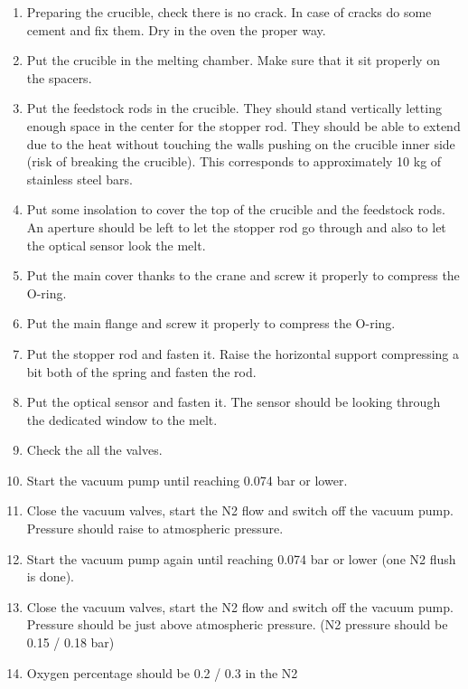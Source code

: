 \documentclass[../../main.tex]{subfiles}
\begin{document}
\begin{enumerate}
    \item Preparing the crucible, check there is no crack. In case of cracks do some cement and fix them. Dry in the oven the proper way.
    \item Put the crucible in the melting chamber. Make sure that it sit properly on the spacers.
    \item Put the feedstock rods in the crucible. They should stand vertically letting enough space in the center for the stopper rod. They should be able to extend due to the heat without touching the walls pushing on the crucible inner side (risk of breaking the crucible). This corresponds to approximately 10 kg of stainless steel bars.
    \item Put some insolation to cover the top of the crucible and the feedstock rods. An aperture should be left to let the stopper rod go through and also to let the optical sensor look the melt.
    \item Put the main cover thanks to the crane and screw it properly to compress the O-ring.
    \item Put the main flange and screw it properly to compress the O-ring.
    \item Put the stopper rod and fasten it. Raise the horizontal support compressing a bit both of the spring and fasten the rod.
    \item Put the optical sensor and fasten it. The sensor should be looking through the dedicated window to the melt.

    \item Check the all the valves.
    \item Start the vacuum pump until reaching 0.074 bar or lower.
    \item Close the vacuum valves, start the N2 flow and switch off the vacuum pump. Pressure should raise to atmospheric pressure.
    \item Start the vacuum pump again until reaching 0.074 bar or lower (one N2 flush is done).
    \item Close the vacuum valves, start the N2 flow and switch off the vacuum pump. Pressure should be just above atmospheric pressure. (N2 pressure should be 0.15 / 0.18 bar)
    \item Oxygen percentage should be 0.2 / 0.3 in the N2

\end{enumerate}
\end{document}
